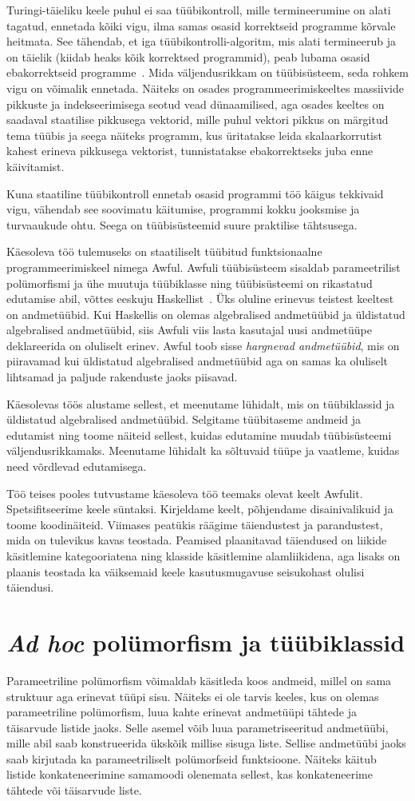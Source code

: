 \documentclass[12pt]{article}
\newcommand\peatykk[1]{
  \clearpage
  \section{#1}}
\begin{document}
    Turingi-täieliku keele puhul ei saa tüübikontroll, mille termineerumine on alati tagatud, ennetada kõiki vigu, ilma samas osasid korrektseid programme kõrvale heitmata. See tähendab, et iga tüübikontrolli-algoritm, mis alati termineerub ja on täielik (kiidab heaks kõik korrektsed programmid), peab lubama osasid ebakorrektseid programme~\cite{Typ}. Mida väljendusrikkam on tüübisüsteem, seda rohkem vigu on võimalik ennetada. Näiteks on osades programmeerimiskeeltes massiivide pikkuste ja indekseerimisega seotud vead dünaamilised, aga osades keeltes on saadaval staatilise pikkusega vektorid, mille puhul vektori pikkus on märgitud tema tüübis ja seega näiteks programm, kus üritatakse leida skalaarkorrutist kahest erineva pikkusega vektorist, tunnistatakse ebakorrektseks juba enne käivitamist.

    Kuna staatiline tüübikontroll ennetab osasid programmi töö käigus tekkivaid vigu, vähendab see soovimatu käitumise, programmi kokku jooksmise ja turvaaukude ohtu. Seega on tüübisüsteemid suure praktilise tähtsusega.

    Käesoleva töö tulemuseks on staatiliselt tüübitud funktsionaalne programmeerimiskeel nimega Awful. Awfuli tüübisüsteem sisaldab parameetrilist polümorfismi ja ühe muutuja tüübiklasse ning tüübisüsteemi on rikastatud edutamise abil, võttes eeskuju Haskellist~\cite{Giv}. Üks oluline erinevus teistest keeltest on andmetüübid. Kui Haskellis on olemas algebralised andmetüübid ja üldistatud algebralised andmetüübid, siis Awfuli viis lasta kasutajal uusi andmetüüpe deklareerida on oluliselt erinev. Awful toob sisse \textit{hargnevad andmetüübid}, mis on piiravamad kui üldistatud algebralised andmetüübid aga on samas ka oluliselt lihtsamad ja paljude rakenduste jaoks piisavad.

    Käesolevas töös alustame sellest, et meenutame lühidalt, mis on tüübiklassid ja üldistatud algebralised andmetüübid. Selgitame tüübitaseme andmeid ja edutamist ning toome näiteid sellest, kuidas edutamine muudab tüübisüsteemi väljendusrikkamaks. Meenutame lühidalt ka sõltuvaid tüüpe ja vaatleme, kuidas need võrdlevad edutamisega.

    Töö teises pooles tutvustame käesoleva töö teemaks olevat keelt Awfulit. Spetsifitseerime keele süntaksi. Kirjeldame keelt, põhjendame disainivalikuid ja toome koodinäiteid. Viimases peatükis räägime täiendustest ja parandustest, mida on tulevikus kavas teostada. Peamised plaanitavad täiendused on liikide käsitlemine kategooriatena ning klasside käsitlemine alamliikidena, aga lisaks on plaanis teostada ka väiksemaid keele kasutusmugavuse seisukohast olulisi täiendusi.
  \peatykk{\textit{Ad hoc} polümorfism ja tüübiklassid}
    Parameetriline polümorfism võimaldab käsitleda koos andmeid, millel on sama struktuur aga erinevat tüüpi sisu. Näiteks ei ole tarvis keeles, kus on olemas parameetriline polümorfism, luua kahte erinevat andmetüüpi tähtede ja täisarvude listide jaoks. Selle asemel võib luua parametriseeritud andmetüübi, mille abil saab konstrueerida ükskõik millise sisuga liste. Sellise andmetüübi jaoks saab kirjutada ka parameetriliselt polümorfseid funktsioone. Näiteks käitub listide konkateneerimine samamoodi olenemata sellest, kas konkateneerime tähtede või täisarvude liste.
\end{document}
